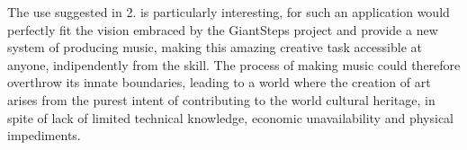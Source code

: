 The use suggested in 2. is particularly interesting, for such an application would perfectly fit the vision embraced by the GiantSteps project and provide a new system of producing music, making this amazing creative task accessible at anyone, indipendently from the skill. The process of making music could therefore overthrow its innate boundaries, leading to a world where the creation of art arises from the purest intent of contributing to the world cultural heritage, in spite of lack of limited technical knowledge, economic unavailability and physical impediments.
